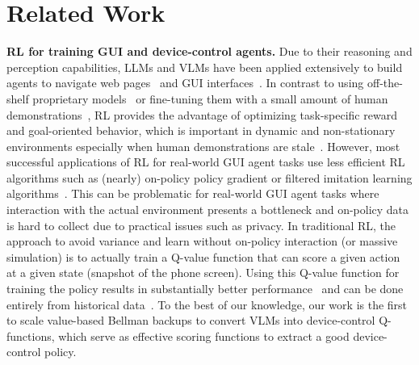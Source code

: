 \vspace{-0.25cm}
\section{Related Work}
\vspace{-0.1cm}

\textbf{RL for training GUI and device-control agents.} Due to their reasoning and perception capabilities, LLMs and VLMs have been applied extensively to build agents to navigate web pages~\citep{zhou2024webarenarealisticwebenvironment, koh2024visualwebarenaevaluatingmultimodalagents, deng2023mind2webgeneralistagentweb, zheng2024gpt4visiongeneralistwebagent, he2024webvoyagerbuildingendtoendweb} and GUI interfaces~\citep{bai2024digirltraininginthewilddevicecontrol, yan2023gpt4vwonderlandlargemultimodal, hong2023cogagentvisuallanguagemodel, rawles2023androidwildlargescaledataset, rawles2024androidworlddynamicbenchmarkingenvironment, zhang2024lookscreensmultimodalchainofaction}. In contrast to using off-the-shelf proprietary models~\citep{zheng2024gpt4visiongeneralistwebagent, yan2023gpt4vwonderlandlargemultimodal, zhang2023appagentmultimodalagentssmartphone, he2024webvoyagerbuildingendtoendweb} or fine-tuning them with a small amount of human demonstrations~\citep{hong2023cogagentvisuallanguagemodel, zhang2024lookscreensmultimodalchainofaction, zeng2023agenttuningenablinggeneralizedagent}, RL provides the advantage of optimizing task-specific reward and goal-oriented behavior, which is important in dynamic and non-stationary environments especially when human demonstrations are stale~\citep{bai2024digirltraininginthewilddevicecontrol, zhou2024archertraininglanguagemodel, putta2024agentqadvancedreasoning, pan2024autonomousevaluationrefinementdigital, song2024trialerrorexplorationbasedtrajectory}.
However, most successful applications of RL for real-world GUI agent tasks use less efficient RL algorithms such as (nearly) on-policy policy gradient or filtered imitation learning algorithms~\citep{bai2024digirltraininginthewilddevicecontrol, putta2024agentqadvancedreasoning, song2024trialerrorexplorationbasedtrajectory, koh2024treesearchlanguagemodel, shao2024deepseekmath}.
This can be problematic for real-world GUI agent tasks where interaction with the actual environment presents a bottleneck and on-policy data is hard to collect due to practical issues such as privacy. 
In traditional RL, the approach to avoid variance and learn without on-policy interaction (or massive simulation) is to actually train a Q-value function that can score a given action at a given state (snapshot of the phone screen). Using this Q-value function for training the policy results in substantially better performance~\citep{mnih2013playingatarideepreinforcement, haarnoja2018softactorcriticoffpolicymaximum, fujimoto2018addressingfunctionapproximationerror} and can be done entirely from historical data~\citep{kumar2020conservativeqlearningofflinereinforcement, fu2021d4rldatasetsdeepdatadriven}. To the best of our knowledge, our work is the first to scale value-based Bellman backups to convert VLMs into device-control Q-functions, which serve as effective scoring functions to extract a good device-control policy.


